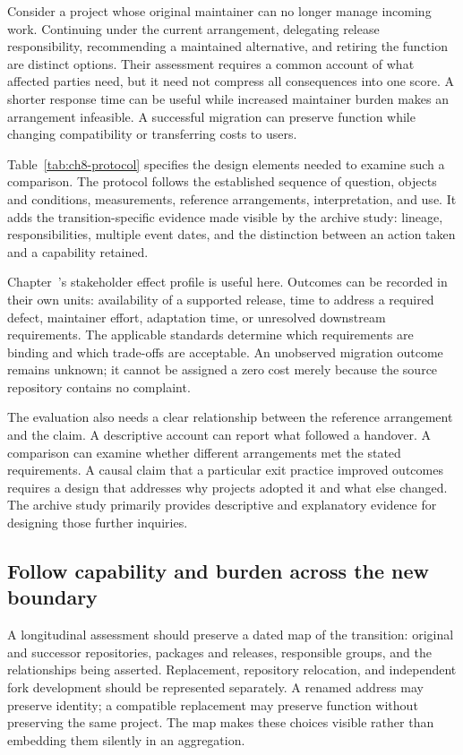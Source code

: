Consider a project whose original maintainer can no longer manage incoming work. Continuing under the current arrangement, delegating release responsibility, recommending a maintained alternative, and retiring the function are distinct options. Their assessment requires a common account of what affected parties need, but it need not compress all consequences into one score. A shorter response time can be useful while increased maintainer burden makes an arrangement infeasible. A successful migration can preserve function while changing compatibility or transferring costs to users.

Table~\ref{tab:ch8-protocol} specifies the design elements needed to examine such a comparison. The protocol follows the established sequence of question, objects and conditions, measurements, reference arrangements, interpretation, and use. It adds the transition-specific evidence made visible by the archive study: lineage, responsibilities, multiple event dates, and the distinction between an action taken and a capability retained.



Chapter~'s stakeholder effect profile is useful here. Outcomes can be recorded in their own units: availability of a supported release, time to address a required defect, maintainer effort, adaptation time, or unresolved downstream requirements. The applicable standards determine which requirements are binding and which trade-offs are acceptable. An unobserved migration outcome remains unknown; it cannot be assigned a zero cost merely because the source repository contains no complaint.

The evaluation also needs a clear relationship between the reference arrangement and the claim. A descriptive account can report what followed a handover. A comparison can examine whether different arrangements met the stated requirements. A causal claim that a particular exit practice improved outcomes requires a design that addresses why projects adopted it and what else changed. The archive study primarily provides descriptive and explanatory evidence for designing those further inquiries.

\subsection{Follow capability and burden across the new boundary}
A longitudinal assessment should preserve a dated map of the transition: original and successor repositories, packages and releases, responsible groups, and the relationships being asserted. Replacement, repository relocation, and independent fork development should be represented separately. A renamed address may preserve identity; a compatible replacement may preserve function without preserving the same project. The map makes these choices visible rather than embedding them silently in an aggregation.

